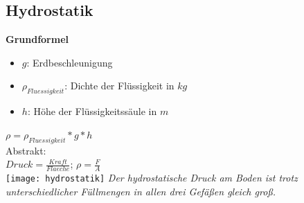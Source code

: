 \documentclass[a4paper,10pt]{article}
\begin{document}
\begin{multicols}{2}
  \section{Hydrostatik}
  \textbf{Grundformel}\\
  \begin{itemize}
    \item \(g\): Erdbeschleunigung
    \item \(\rho_{Fluessigkeit}\): Dichte der Flüssigkeit in \(kg\)
    \item \(h\): Höhe der Flüssigkeitssäule in \(m\)
  \end{itemize}
  \(\rho = \rho_{Fluessigkeit} * g * h\)\\
  Abstrakt:\\
  \(Druck = \frac{Kraft}{Flaeche}\); \(\rho = \frac{F}{A}\) \\
  \texttt{[image: hydrostatik]}
  \textit{Der hydrostatische Druck am Boden ist trotz unterschiedlicher Füllmengen in allen drei Gefäßen gleich groß.}
\end{multicols}
\end{document}
